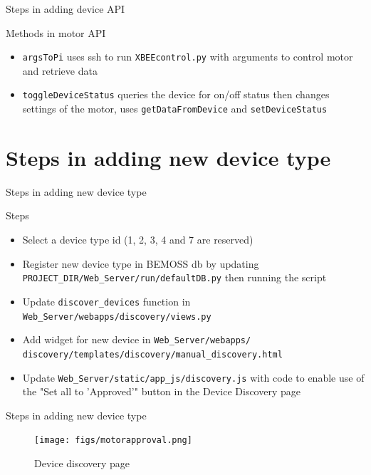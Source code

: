 \documentclass{beamer}
\begin{document}
\begin{frame}{Steps in adding device API}{}
\begin{block}{Methods in motor API}
\begin{itemize}
	\item \texttt{argsToPi} uses ssh to run \texttt{XBEEcontrol.py} with arguments to control motor and retrieve data
	\item \texttt{toggleDeviceStatus} queries the device for on/off status then changes settings of the motor, uses \texttt{getDataFromDevice} and \texttt{setDeviceStatus}
\end{itemize}
\end{block}
\end{frame}

\section{Steps in adding new device type}
\begin{frame}{Steps in adding new device type}{}
\begin{block}{Steps}
\begin{itemize}
\item Select a device type id (1, 2, 3, 4 and 7 are reserved)
\item Register new device type in BEMOSS db by updating \texttt{PROJECT\_DIR/Web\_Server/run/defaultDB.py} then running the script
\item Update \texttt{discover\_devices} function in \texttt{Web\_Server/webapps/discovery/views.py}
\item Add widget for new device in \texttt{Web\_Server/webapps/
discovery/templates/discovery/manual\_discovery.html}
\item Update \texttt{Web\_Server/static/app\_js/discovery.js} with code to enable use of the "Set all to 'Approved'" button in the Device Discovery page
\end{itemize}
\end{block}
\end{frame}

\begin{frame}{Steps in adding new device type}{}
\begin{figure}
\texttt{[image: figs/motorapproval.png]}
\caption{Device discovery page}
\end{figure}
\end{frame}
\end{document}
